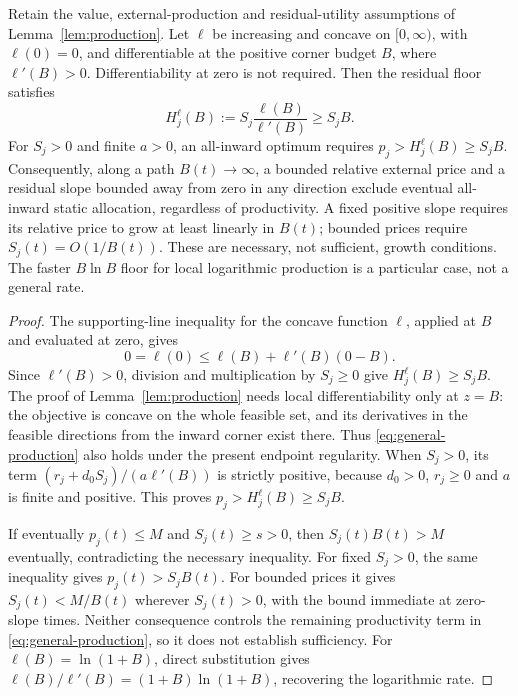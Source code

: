 \begin{productioncorollary}
\label{cor:production-growth}
Retain the value, external-production and residual-utility assumptions of
Lemma~\ref{lem:production}. Let $\ell$ be increasing and concave on
$[0,\infty)$, with $\ell(0)=0$, and differentiable at the positive
corner budget $B$, where $\ell'(B)>0$. Differentiability at zero is
not required. Then the residual floor satisfies
\[
 H_j^{\ell}(B):=S_j\frac{\ell(B)}{\ell'(B)}\geq S_jB.
\]
For $S_j>0$ and finite $a>0$, an all-inward optimum requires
$p_j>H_j^{\ell}(B)\geq S_jB$. Consequently, along a path
$B(t)\to\infty$, a bounded relative external price and a residual slope
bounded away from zero in any direction exclude eventual all-inward
static allocation, regardless of productivity. A fixed positive slope
requires its relative price to grow at least linearly in $B(t)$;
bounded prices require $S_j(t)=O(1/B(t))$. These are necessary,
not sufficient, growth conditions. The faster $B\ln B$ floor for local
logarithmic production is a particular case, not a general rate.
\end{productioncorollary}
\begin{proof}
The supporting-line inequality for the concave function $\ell$, applied
at $B$ and evaluated at zero, gives
\[
 0=\ell(0)\leq\ell(B)+\ell'(B)(0-B).
\]
Since $\ell'(B)>0$, division and multiplication by $S_j\geq0$ give
$H_j^{\ell}(B)\geq S_jB$. The proof of Lemma~\ref{lem:production} needs
local differentiability only at $z=B$: the objective is concave on the
whole feasible set, and its derivatives in the feasible directions from
the inward corner exist there. Thus \cref{eq:general-production} also
holds under the present endpoint regularity. When $S_j>0$, its term
$(r_j+d_0S_j)/(a\ell'(B))$ is strictly positive, because $d_0>0$,
$r_j\geq0$ and $a$ is finite and positive. This proves
$p_j>H_j^{\ell}(B)\geq S_jB$.

If eventually $p_j(t)\leq M$ and $S_j(t)\geq s>0$, then
$S_j(t)B(t)>M$ eventually, contradicting the necessary inequality.
For fixed $S_j>0$, the same inequality gives $p_j(t)>S_jB(t)$.
For bounded prices it gives $S_j(t)<M/B(t)$ wherever $S_j(t)>0$,
with the bound immediate at zero-slope times. Neither consequence
controls the remaining productivity term in
\cref{eq:general-production}, so it does not establish sufficiency.
For $\ell(B)=\ln(1+B)$, direct substitution gives
$\ell(B)/\ell'(B)=(1+B)\ln(1+B)$, recovering the logarithmic rate.
\end{proof}
